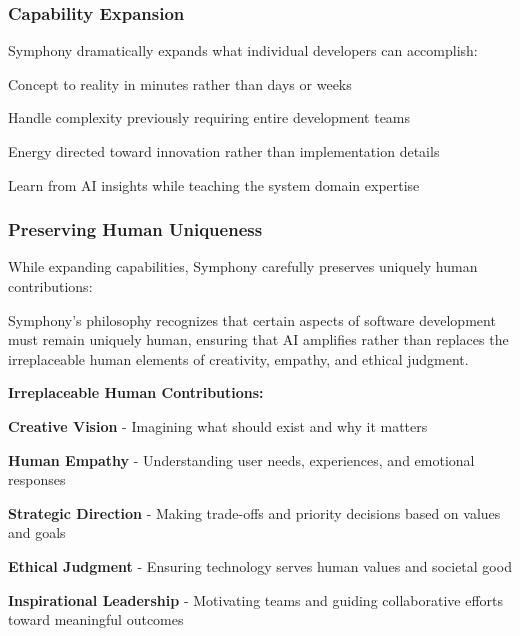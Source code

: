 \subsubsection{Capability Expansion}

Symphony dramatically expands what individual developers can accomplish:

\begin{description}[leftmargin=2.5cm,labelwidth=2cm]
    \item[\textbf{Speed}] Concept to reality in minutes rather than days or weeks
    
    \item[\textbf{Scope}] Handle complexity previously requiring entire development teams
    
    \item[\textbf{Focus}] Energy directed toward innovation rather than implementation details
    
    \item[\textbf{Growth}] Learn from AI insights while teaching the system domain expertise
\end{description}

\subsubsection{Preserving Human Uniqueness}

While expanding capabilities, Symphony carefully preserves uniquely human contributions:

\begin{alertbox}
Symphony's philosophy recognizes that certain aspects of software development must remain uniquely human, ensuring that AI amplifies rather than replaces the irreplaceable human elements of creativity, empathy, and ethical judgment.
\end{alertbox}

\textbf{Irreplaceable Human Contributions:}

\begin{expandedlist}
    \item \textbf{Creative Vision} - Imagining what should exist and why it matters
    
    \item \textbf{Human Empathy} - Understanding user needs, experiences, and emotional responses
    
    \item \textbf{Strategic Direction} - Making trade-offs and priority decisions based on values and goals
    
    \item \textbf{Ethical Judgment} - Ensuring technology serves human values and societal good
    
    \item \textbf{Inspirational Leadership} - Motivating teams and guiding collaborative efforts toward meaningful outcomes
\end{expandedlist}

